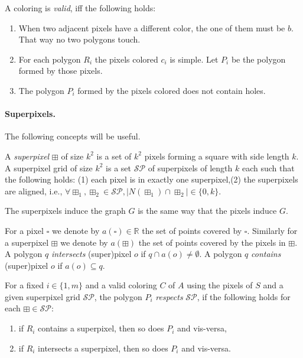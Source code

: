 \documentclass[a4paper, UKenglish]{lipics-v2018}
\newcommand{\mremark}[3]{\textcolor{blue}{\textsc{#1 #2:}} \textcolor{SeaGreen}{\textsf{#3}}}
\newcommand{\jerome}[2][says]{\mremark{J\'er\^ome}{#1}{#2}}
\newcommand{\spg}{\mathcal{S\!P}}
\newcommand{\pix}{\square}
\newcommand{\spix}{\boxplus}
\begin{document}
\begin{definition}
A coloring is \emph{valid}, iff the following holds:
\begin{enumerate}
	\item When two adjacent pixels have a different color, the one of them must be $b$. That way no two polygons touch.
	\item For each polygon $R_i$ the pixels colored $c_i$ is simple. Let $P_i$ be the polygon formed by those pixels.
	\item The polygon $P_i$ formed by the pixels colored does not contain holes.
\end{enumerate}

\end{definition}


\paragraph {Superpixels.}

The following concepts will be useful.

\begin{definition}
A \emph{superpixel} $\spix$ of size $k^2$ is a set of $k^2$ pixels forming a square with side length $k$.
A superpixel grid of size $k^2$ is a set $\spg$ of superpixels of length $k$ each such that the following holds:
(1) each pixel is in exactly one superpixel,(2) the superpixels are aligned, i.e., $\forall \spix_1, \spix_2\in \spg, |N(\spix_1)\cap \spix_2| \in \{0, k\}$.
\end{definition}

The superpixels induce the graph $G$ is the same way that the pixels induce $G$.

For a pixel $\pix$ we denote by $a(\pix)\in \mathbb{R}$ the set of points covered by $\pix$. Similarly for a superpixel $\spix$ we denote by $a(\spix)$ the set of points covered by the pixels in $\spix$. A polygon $q$ \emph{intersects} (super)pixel $o$ if $q\cap a(o)\neq \emptyset$. A polygon $q$ \emph{contains} (super)pixel $o$ if $a(o)\subseteq q$. 

\begin{definition}
For a fixed $i\in \{1, m\}$ and a valid coloring $C$ of $A$ using the pixels of $S$ and a given superpixel grid $\spg$, the polygon $P_i$ \emph{respects} $\spg$, if the following holds for each $\spix\in \spg$:
\begin{enumerate}
	\item if $R_i$ contains a superpixel, then so does $P_i$ and vis-versa,
	\item if $R_i$ intersects a superpixel, then so does $P_i$ and vis-versa.
\end{enumerate}
\end{definition}
\end{document}
